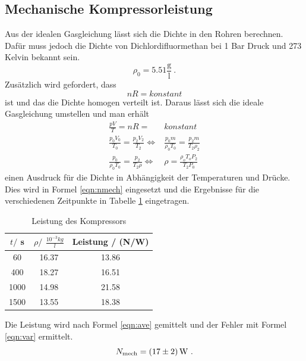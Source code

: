 \subsection{Mechanische Kompressorleistung}
Aus der idealen Gasgleichung lässt sich die Dichte in den Rohren berechnen. Dafür muss jedoch die Dichte von Dichlordifluormethan bei 1 Bar Druck und 273 Kelvin bekannt sein.
\begin{equation}
  \rho_\text{0} =  5.51 \frac{\text{g}}{\text{l}} \ .
  \label{rho}
\end{equation}
Zusätzlich wird gefordert, dass
\begin{equation}
  nR = konstant
\end{equation}
ist und das die Dichte homogen verteilt ist. Daraus lässt sich die ideale Gasgleichung umstellen und man erhält
\begin{eqnarray*}
  \frac{pV}{T} =nR =& konstant \\
  \frac{p_0 V_0}{T_0} = \frac{p_2 V_2}{T_\text{2}}  \Leftrightarrow&  \frac{p_0 m}{\rho_0 T_0} = \frac{p_2 m}{T_\text{2} \rho_2} \\
  \frac{p_0}{\rho_0 T_0} = \frac{p_2}{T_\text{2} \rho} \Leftrightarrow& \rho = \frac{\rho_o T_o P_2}{T_\text{2} P_0}
  \label{eqn:rho}
\end{eqnarray*}
einen Ausdruck für die Dichte in Abhängigkeit der Temperaturen und Drücke. Dies wird in Formel \ref{eqn:nmech} eingesetzt und die Ergebnisse für die verschiedenen Zeitpunkte in Tabelle \ref{tab:LdK} eingetragen.
\begin{table}
  \centering
  \begin{tabular}{c c c}
    \toprule
    $t /$ s & $\rho /$ $\frac{10^{-3}kg}{l}$ & Leistung / (N/W) \\
    \midrule
    60   & 16.37 & 13.86 \\
    400  & 18.27 & 16.51 \\
    1000 & 14.98 & 21.58 \\
    1500 & 13.55 & 18.38 \\
    \bottomrule
  \end{tabular}
  \caption{Leistung des Kompressors}
  \label{tab:LdK}
\end{table}
Die Leistung wird nach Formel \ref{eqn:ave} gemittelt und der Fehler mit Formel \ref{eqn:var} ermittelt.
\begin{equation}
  N_{\text{mech}} = ( \num{17 +- 2} ) \, \text{W} \ .
\end{equation}
\newpage
